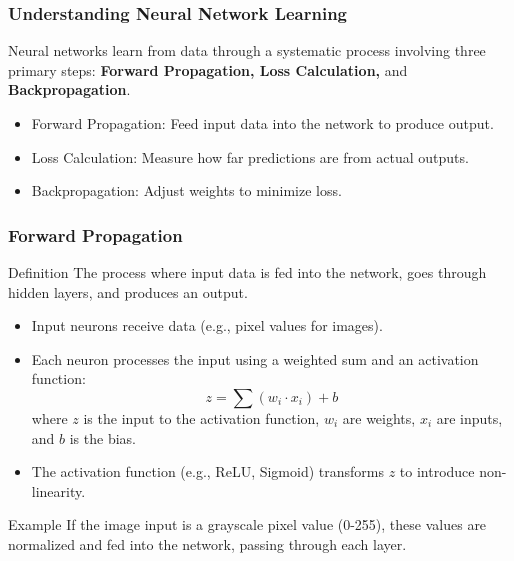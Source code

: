 \documentclass[aspectratio=169]{beamer}
\begin{document}
\begin{frame}[fragile]
    \frametitle{Understanding Neural Network Learning}
    Neural networks learn from data through a systematic process involving three primary steps: 
    \textbf{Forward Propagation, Loss Calculation,} and \textbf{Backpropagation}. 

    \begin{itemize}
        \item Forward Propagation: Feed input data into the network to produce output.
        \item Loss Calculation: Measure how far predictions are from actual outputs.
        \item Backpropagation: Adjust weights to minimize loss.
    \end{itemize}
\end{frame}

\begin{frame}[fragile]
    \frametitle{Forward Propagation}
    \begin{block}{Definition}
        The process where input data is fed into the network, goes through hidden layers, and produces an output.
    \end{block}

    \begin{itemize}
        \item Input neurons receive data (e.g., pixel values for images).
        \item Each neuron processes the input using a weighted sum and an activation function:
        \begin{equation}
            z = \sum (w_i \cdot x_i) + b
        \end{equation}
        where \(z\) is the input to the activation function, \(w_i\) are weights, \(x_i\) are inputs, and \(b\) is the bias.
        \item The activation function (e.g., ReLU, Sigmoid) transforms \(z\) to introduce non-linearity.
    \end{itemize}

    \begin{block}{Example}
        If the image input is a grayscale pixel value (0-255), these values are normalized and fed into the network, passing through each layer.
    \end{block}
\end{frame}
\end{document}
